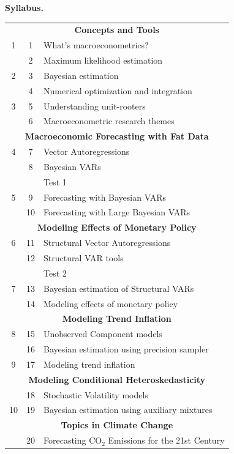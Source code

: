 \documentclass[10pt]{article}
\begin{document}
\begin{multicols}{2}
\noindent\textbf{Syllabus.}
\begin{center}
\begin{tabular}{c c l}
\toprule 
\multicolumn{3}{c}{\textbf{Concepts and Tools}}\\
1 & 1  & What's macroeconometrics? \\
   & 2  & Maximum likelihood estimation  \\
2 & 3  & Bayesian estimation \\
   & 4  & Numerical optimization and integration \\
3 & 5  & Understanding unit-rooters \\
   & 6  & Macroeconometric research themes \\[1ex]
\multicolumn{3}{c}{\textbf{Macroeconomic Forecasting with Fat Data}}\\
4 & 7  & Vector Autoregressions \\
   & 8  & Bayesian VARs \\
      &    & Test 1 \\
5 & 9  & Forecasting with Bayesian VARs \\
   & 10  & Forecasting with Large Bayesian VARs \\[1ex]
\multicolumn{3}{c}{\textbf{Modeling Effects of Monetary Policy}}\\
6 & 11  & Structural Vector Autoregressions \\
   & 12  & Structural VAR tools \\
   &    & Test 2 \\
7 & 13  & Bayesian estimation of Structural VARs \\
   & 14  & Modeling effects of monetary policy \\[1ex]
\multicolumn{3}{c}{\textbf{Modeling Trend Inflation}}\\
8 & 15  & Unobserved Component models \\
   & 16  & Bayesian estimation using precision sampler \\
9  & 17  & Modeling trend inflation \\[1ex]
\multicolumn{3}{c}{\textbf{Modeling Conditional Heteroskedasticity}}\\
   & 18  & Stochastic Volatility models \\
 10 & 19  & Bayesian estimation using auxiliary mixtures \\[1ex]
\multicolumn{3}{c}{\textbf{Topics in Climate Change}}\\
   & 20  & Forecasting CO$_2$ Emissions for the 21st Century \\[1ex]

\end{tabular}
\end{center}
\end{multicols}
\end{document}
